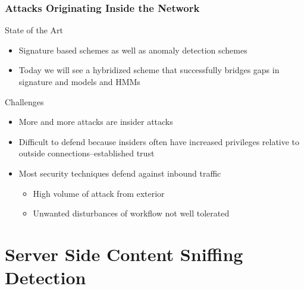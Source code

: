 \documentclass[10pt,mathserif]{beamer}
\begin{document}
\begin{frame}
  \frametitle{Attacks Originating Inside the Network}
  \begin{block}{State of the Art}
    \begin{itemize}
    \item Signature based schemes as well as anomaly detection schemes
    \item Today we will see a hybridized scheme that successfully
      bridges gaps in signature and models and HMMs
    \end{itemize}
  \end{block}

  \begin{block}{Challenges}
    \begin{itemize}
    \item More and more attacks are insider attacks
    \item Difficult to defend because insiders often have increased
      privileges relative to outside connections--established trust
    \item Most security techniques defend against inbound traffic
      \begin{itemize}
      \item High volume of attack from exterior
      \item Unwanted disturbances of workflow not well tolerated
      \end{itemize}
    \end{itemize}
  \end{block}
\end{frame}

\section{Server Side Content Sniffing Detection}
\end{document}
